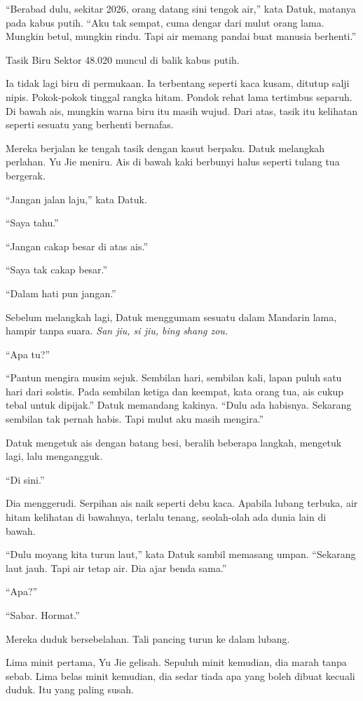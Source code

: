 \documentclass[
  11pt,
  a5paper,
  openany,
  oneside]{book}
\begin{document}
``Berabad dulu, sekitar 2026, orang datang sini tengok air,'' kata
Datuk, matanya pada kabus putih. ``Aku tak sempat, cuma dengar dari
mulut orang lama. Mungkin betul, mungkin rindu. Tapi air memang pandai
buat manusia berhenti.''

Tasik Biru Sektor 48.020 muncul di balik kabus putih.

Ia tidak lagi biru di permukaan. Ia terbentang seperti kaca kusam,
ditutup salji nipis. Pokok-pokok tinggal rangka hitam. Pondok rehat lama
tertimbus separuh. Di bawah ais, mungkin warna biru itu masih wujud.
Dari atas, tasik itu kelihatan seperti sesuatu yang berhenti bernafas.

Mereka berjalan ke tengah tasik dengan kasut berpaku. Datuk melangkah
perlahan. Yu Jie meniru. Ais di bawah kaki berbunyi halus seperti tulang
tua bergerak.

``Jangan jalan laju,'' kata Datuk.

``Saya tahu.''

``Jangan cakap besar di atas ais.''

``Saya tak cakap besar.''

``Dalam hati pun jangan.''

Sebelum melangkah lagi, Datuk menggumam sesuatu dalam Mandarin lama,
hampir tanpa suara. \emph{San jiu, si jiu, bing shang zou.}

``Apa tu?''

``Pantun mengira musim sejuk. Sembilan hari, sembilan kali, lapan puluh
satu hari dari solstis. Pada sembilan ketiga dan keempat, kata orang
tua, ais cukup tebal untuk dipijak.'' Datuk memandang kakinya. ``Dulu
ada habisnya. Sekarang sembilan tak pernah habis. Tapi mulut aku masih
mengira.''

Datuk mengetuk ais dengan batang besi, beralih beberapa langkah,
mengetuk lagi, lalu mengangguk.

``Di sini.''

Dia menggerudi. Serpihan ais naik seperti debu kaca. Apabila lubang
terbuka, air hitam kelihatan di bawahnya, terlalu tenang, seolah-olah
ada dunia lain di bawah.

``Dulu moyang kita turun laut,'' kata Datuk sambil memasang umpan.
``Sekarang laut jauh. Tapi air tetap air. Dia ajar benda sama.''

``Apa?''

``Sabar. Hormat.''

Mereka duduk bersebelahan. Tali pancing turun ke dalam lubang.

Lima minit pertama, Yu Jie gelisah. Sepuluh minit kemudian, dia marah
tanpa sebab. Lima belas minit kemudian, dia sedar tiada apa yang boleh
dibuat kecuali duduk. Itu yang paling susah.
\end{document}
